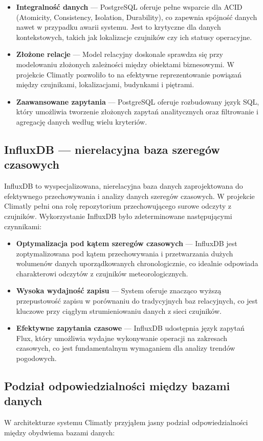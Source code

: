 \documentclass[a4paper,12pt,openany]{book}
\begin{document}
\begin{itemize}
  \item \textbf{Integralność danych} --- PostgreSQL oferuje pełne wsparcie dla ACID (Atomicity, Consistency, Isolation, Durability), co zapewnia spójność danych nawet w przypadku awarii systemu. Jest to krytyczne dla danych kontekstowych, takich jak lokalizacje czujników czy ich statusy operacyjne.
  \item \textbf{Złożone relacje} --- Model relacyjny doskonale sprawdza się przy modelowaniu złożonych zależności między obiektami biznesowymi. W projekcie Climatly pozwoliło to na efektywne reprezentowanie powiązań między czujnikami, lokalizacjami, budynkami i piętrami.
  \item \textbf{Zaawansowane zapytania} --- PostgreSQL oferuje rozbudowany język SQL, który umożliwia tworzenie złożonych zapytań analitycznych oraz filtrowanie i agregację danych według wielu kryteriów.
\end{itemize}

\subsection*{InfluxDB --- nierelacyjna baza szeregów czasowych}
InfluxDB to wyspecjalizowana, nierelacyjna baza danych zaprojektowana do efektywnego przechowywania i analizy danych szeregów czasowych. W projekcie Climatly pełni ona rolę repozytorium przechowującego surowe odczyty z czujników. Wykorzystanie InfluxDB było zdeterminowane następującymi czynnikami:

\begin{itemize}
  \item \textbf{Optymalizacja pod kątem szeregów czasowych} --- InfluxDB jest zoptymalizowana pod kątem przechowywania i przetwarzania dużych wolumenów danych uporządkowanych chronologicznie, co idealnie odpowiada charakterowi odczytów z czujników meteorologicznych.
  \item \textbf{Wysoka wydajność zapisu} --- System oferuje znacząco wyższą przepustowość zapisu w porównaniu do tradycyjnych baz relacyjnych, co jest kluczowe przy ciągłym strumieniowaniu danych z sieci czujników.
  \item \textbf{Efektywne zapytania czasowe} --- InfluxDB udostępnia język zapytań Flux, który umożliwia wydajne wykonywanie operacji na zakresach czasowych, co jest fundamentalnym wymaganiem dla analizy trendów pogodowych.
\end{itemize}

\subsection*{Podział odpowiedzialności między bazami danych}
W architekturze systemu Climatly przyjąłem jasny podział odpowiedzialności między obydwiema bazami danych:
\end{document}
